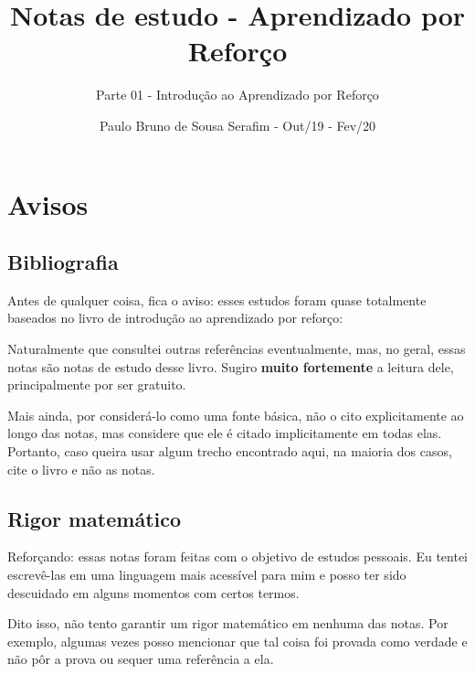 \documentclass{article}
\title{Notas de estudo - Aprendizado por Reforço}
\author{Parte 01 - Introdução ao Aprendizado por Reforço}
\date{Paulo Bruno de Sousa Serafim - Out/19 - Fev/20}
\begin{document}
\maketitle

    \section{Avisos}
    
        \subsection{Bibliografia}
        
            Antes de qualquer coisa, fica o aviso: esses estudos foram quase totalmente baseados no livro de introdução ao aprendizado por reforço:
        
            \begin{center}
            \noindent{}%
            \end{center}
            
            Naturalmente que consultei outras referências eventualmente, mas, no geral, essas notas são notas de estudo desse livro. Sugiro \textbf{muito fortemente} a leitura dele, principalmente por ser gratuito.
            
            Mais ainda, por considerá-lo como uma fonte básica, não o cito explicitamente ao longo das notas, mas considere que ele é citado implicitamente em todas elas. Portanto, caso queira usar algum trecho encontrado aqui, na maioria dos casos, cite o livro e não as notas.
            
        \subsection{Rigor matemático}
        
            Reforçando: essas notas foram feitas com o objetivo de estudos pessoais. Eu tentei escrevê-las em uma linguagem mais acessível para mim e posso ter sido descuidado em alguns momentos com certos termos.
            
            Dito isso, não tento garantir um rigor matemático em nenhuma das notas. Por exemplo, algumas vezes posso mencionar que tal coisa foi provada como verdade e não pôr a prova ou sequer uma referência a ela.
            
\end{document}

